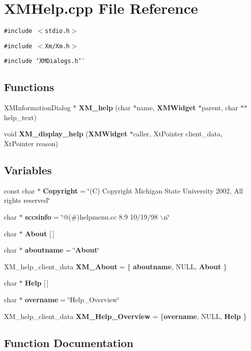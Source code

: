 \section{XMHelp.cpp File Reference}
\label{XMHelp_8cpp}
{\tt \#include $<$stdio.h$>$}\par
{\tt \#include $<$Xm/Xm.h$>$}\par
{\tt \#include \char`\"{}XMDialogs.h\char`\"{}}\par
\subsection*{Functions}
\begin{CompactItemize}
\item 
XMInformation\-Dialog $\ast$ {\bf XM\_\-help} (char $\ast$name, {\bf XMWidget} $\ast$parent, char $\ast$$\ast$help\_\-text)
\item 
void {\bf XM\_\-display\_\-help} ({\bf XMWidget} $\ast$caller, Xt\-Pointer client\_\-data, Xt\-Pointer reason)
\end{CompactItemize}
\subsection*{Variables}
\begin{CompactItemize}
\item 
const char $\ast$ {\bf Copyright} = \char`\"{}(C) Copyright Michigan State University 2002, All rights reserved\char`\"{}
\item 
char $\ast$ {\bf sccsinfo} = \char`\"{}@(\#)helpmenu.cc 8.9 10/19/98 $\backslash$n\char`\"{}
\item 
char $\ast$ {\bf About} [$\,$]
\item 
char $\ast$ {\bf aboutname} = \char`\"{}{\bf About}\char`\"{}
\item 
XM\_\-help\_\-client\_\-data {\bf XM\_\-About} = \{ {\bf aboutname}, NULL, {\bf About} \}
\item 
char $\ast$ {\bf Help} [$\,$]
\item 
char $\ast$ {\bf overname} = \char`\"{}Help\_\-Overview\char`\"{}
\item 
XM\_\-help\_\-client\_\-data {\bf XM\_\-Help\_\-Overview} = \{{\bf overname}, NULL, {\bf Help} \}
\end{CompactItemize}


\subsection{Function Documentation}
